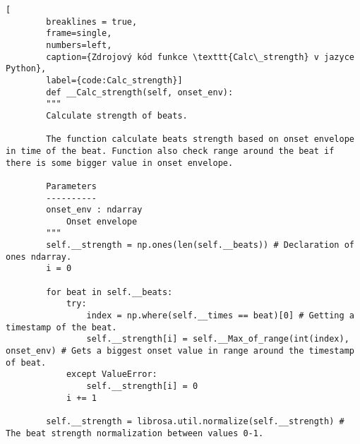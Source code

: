 \begin{minipage}{\linewidth}
	\begin{lstlisting}[
		breaklines = true,
		frame=single,
		numbers=left,
		caption={Zdrojový kód funkce \texttt{Calc\_strength} v jazyce Python},
		label={code:Calc_strength}]
		def __Calc_strength(self, onset_env):
		"""
		Calculate strength of beats.

		The function calculate beats strength based on onset envelope in time of the beat. Function also check range around the beat if there is some bigger value in onset envelope.

		Parameters
		----------
		onset_env : ndarray
			Onset envelope
		"""
		self.__strength = np.ones(len(self.__beats)) # Declaration of ones ndarray.
		i = 0

		for beat in self.__beats:
			try:
				index = np.where(self.__times == beat)[0] # Getting a timestamp of the beat.
				self.__strength[i] = self.__Max_of_range(int(index), onset_env) # Gets a biggest onset value in range around the timestamp of beat.
			except ValueError:
				self.__strength[i] = 0
			i += 1

		self.__strength = librosa.util.normalize(self.__strength) # The beat strength normalization between values 0-1.
	
	\end{lstlisting}
\end{minipage}

